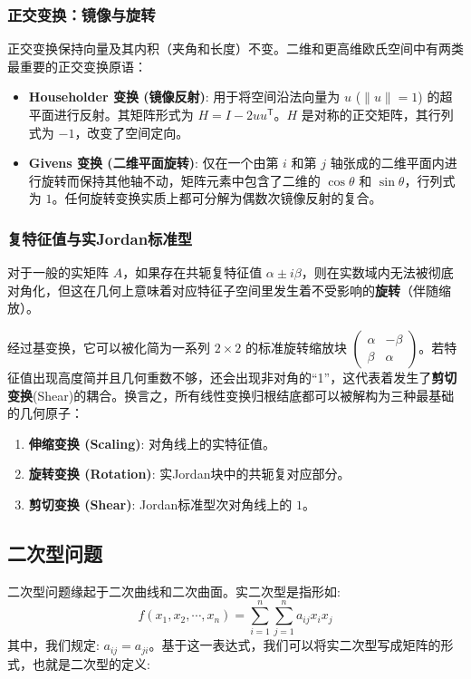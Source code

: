 \documentclass[a4paper,12pt]{ctexart}
\begin{document}
\subsubsection{正交变换：镜像与旋转}
正交变换保持向量及其内积（夹角和长度）不变。二维和更高维欧氏空间中有两类最重要的正交变换原语：
\begin{itemize}
    \item \textbf{Householder 变换 (镜像反射)}: 用于将空间沿法向量为 $u$ ($\|u\|=1$) 的超平面进行反射。其矩阵形式为 $H = I - 2uu^{\mathsf{T}}$。$H$ 是对称的正交矩阵，其行列式为 $-1$，改变了空间定向。
    \item \textbf{Givens 变换 (二维平面旋转)}: 仅在一个由第 $i$ 和第 $j$ 轴张成的二维平面内进行旋转而保持其他轴不动，矩阵元素中包含了二维的 $\cos\theta$ 和 $\sin\theta$，行列式为 $1$。任何旋转变换实质上都可分解为偶数次镜像反射的复合。
\end{itemize}

\subsubsection{复特征值与实Jordan标准型}
对于一般的实矩阵 $A$，如果存在共轭复特征值 $\alpha \pm i\beta$，则在实数域内无法被彻底对角化，但这在几何上意味着对应特征子空间里发生着不受影响的\textbf{旋转}（伴随缩放）。

经过基变换，它可以被化简为一系列 $2 \times 2$ 的标准旋转缩放块 $\begin{pmatrix} \alpha & -\beta \\ \beta & \alpha \end{pmatrix}$。若特征值出现高度简并且几何重数不够，还会出现非对角的“1”，这代表着发生了\textbf{剪切变换}(Shear)的耦合。换言之，所有线性变换归根结底都可以被解构为三种最基础的几何原子：
\begin{enumerate}
    \item \textbf{伸缩变换 (Scaling)}: 对角线上的实特征值。
    \item \textbf{旋转变换 (Rotation)}: 实Jordan块中的共轭复对应部分。
    \item \textbf{剪切变换 (Shear)}: Jordan标准型次对角线上的 $1$。
\end{enumerate}

\subsection{二次型问题}

二次型问题缘起于二次曲线和二次曲面。实二次型是指形如:
\[
f(x_1, x_2, \cdots, x_n) = \sum_{i=1}^n \sum_{j=1}^n a_{ij} x_i x_j
\]
其中，我们规定: $a_{ij} = a_{ji}$。基于这一表达式，我们可以将实二次型写成矩阵的形式，也就是二次型的定义:
\end{document}
